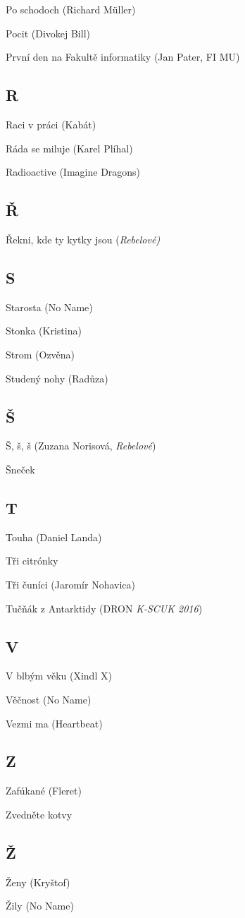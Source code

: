 \begin{multicols}{2}
Po schodoch (Richard Müller)

Pocit (Divokej Bill)

První den na Fakultě informatiky (Jan Pater, FI MU)

\subsection*{R}
Raci v práci (Kabát)

Ráda se miluje (Karel Plíhal)

Radioactive (Imagine Dragons)

\subsection*{Ř}
Řekni, kde ty kytky jsou (\emph{Rebelové)}

\subsection*{S}
Starosta (No Name)

Stonka (Kristina)

Strom (Ozvěna)

Studený nohy (Radůza)

\subsection*{Š}
Š, š, š (Zuzana Norisová, \emph{Rebelové})

Šneček

\subsection*{T}
Touha (Daniel Landa)

Tři citrónky

Tři čuníci (Jaromír Nohavica)

Tučňák z Antarktidy (DRON \emph{K-SCUK 2016})

\subsection*{V}
V blbým věku (Xindl X)

Věčnost (No Name)

Vezmi ma (Heartbeat)

\subsection*{Z}
Zafúkané (Fleret)

Zvedněte kotvy

\subsection*{Ž}
Ženy (Kryštof)

Žily (No Name)

\end{multicols}

\newpage
